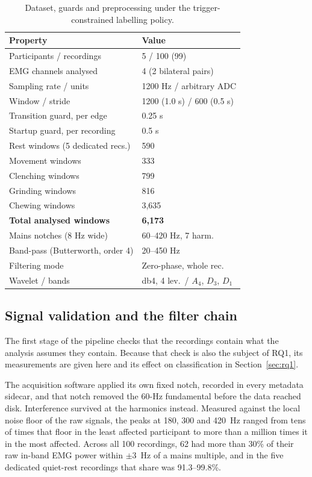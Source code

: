 \documentclass[pdflatex,sn-nature,iicol]{sn-jnl}
\begin{document}
\begin{table}[t]
  \caption{Dataset, guards and preprocessing under the trigger-constrained labelling policy.}
  \label{tab:dataset}
  \centering
  \footnotesize
  \begin{tabular*}{\columnwidth}{@{\extracolsep{\fill}}ll@{}}
    \toprule
    Property & Value \\
    \midrule
    Participants / recordings & 5 / 100 (99) \\
    EMG channels analysed & 4 (2 bilateral pairs) \\
    Sampling rate / units & 1200 Hz / arbitrary ADC \\
    Window / stride & 1200 (1.0 s) / 600 (0.5 s) \\
    Transition guard, per edge & 0.25 s \\
    Startup guard, per recording & 0.5 s \\
    \midrule
    Rest windows (5 dedicated recs.) & 590 \\
    Movement windows & 333 \\
    Clenching windows & 799 \\
    Grinding windows & 816 \\
    Chewing windows & 3,635 \\
    \textbf{Total analysed windows} & \textbf{6{,}173} \\
    \midrule
    Mains notches (8 Hz wide) & 60--420 Hz, 7 harm. \\
    Band-pass (Butterworth, order 4) & 20--450 Hz \\
    Filtering mode & Zero-phase, whole rec. \\
    Wavelet / bands & db4, 4 lev.\ / $A_4$, $D_3$, $D_1$ \\
    \bottomrule
  \end{tabular*}
\end{table}

\subsection{Signal validation and the filter chain}
\label{sec:filter}

The first stage of the pipeline checks that the recordings contain what the analysis assumes they contain. Because that check is also the subject of RQ1, its measurements are given here and its effect on classification in Section~\ref{sec:rq1}.

The acquisition software applied its own fixed notch, recorded in every metadata sidecar, and that notch removed the 60-Hz fundamental before the data reached disk. Interference survived at the harmonics instead. Measured against the local noise floor of the raw signals, the peaks at 180, 300 and 420~Hz ranged from tens of times that floor in the least affected participant to more than a million times it in the most affected. Across all 100 recordings, 62 had more than 30\% of their raw in-band EMG power within $\pm 3$~Hz of a mains multiple, and in the five dedicated quiet-rest recordings that share was 91.3--99.8\%.
\end{document}
